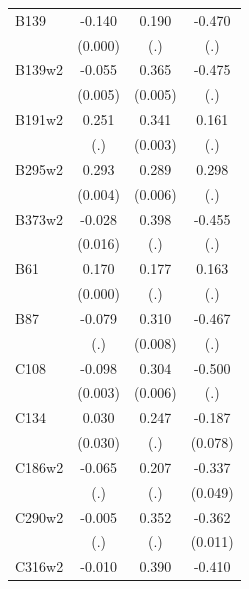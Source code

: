 \begin{table}[htbp]
\begin{tabular}{l*{3}{c}}
B139            &   -0.140\sym{***}&    0.190         &   -0.470         \\
                &  (0.000)         &      (.)         &      (.)         \\
B139w2          &   -0.055\sym{***}&    0.365\sym{***}&   -0.475         \\
                &  (0.005)         &  (0.005)         &      (.)         \\
B191w2          &    0.251         &    0.341\sym{***}&    0.161         \\
                &      (.)         &  (0.003)         &      (.)         \\
B295w2          &    0.293\sym{***}&    0.289\sym{***}&    0.298         \\
                &  (0.004)         &  (0.006)         &      (.)         \\
B373w2          &   -0.028\sym{*}  &    0.398         &   -0.455         \\
                &  (0.016)         &      (.)         &      (.)         \\
B61             &    0.170\sym{***}&    0.177         &    0.163         \\
                &  (0.000)         &      (.)         &      (.)         \\
B87             &   -0.079         &    0.310\sym{***}&   -0.467         \\
                &      (.)         &  (0.008)         &      (.)         \\
C108            &   -0.098\sym{***}&    0.304\sym{***}&   -0.500         \\
                &  (0.003)         &  (0.006)         &      (.)         \\
C134            &    0.030         &    0.247         &   -0.187\sym{**} \\
                &  (0.030)         &      (.)         &  (0.078)         \\
C186w2          &   -0.065         &    0.207         &   -0.337\sym{***}\\
                &      (.)         &      (.)         &  (0.049)         \\
C290w2          &   -0.005         &    0.352         &   -0.362\sym{***}\\
                &      (.)         &      (.)         &  (0.011)         \\
C316w2          &   -0.010         &    0.390         &   -0.410\sym{***}\\

\end{tabular}
\end{table}
